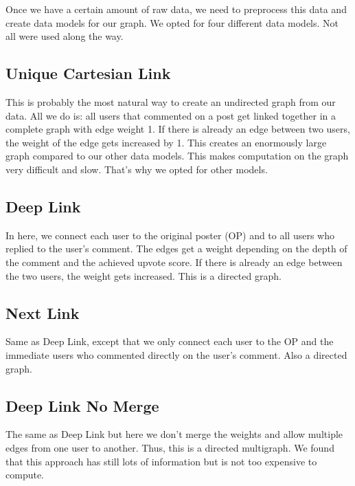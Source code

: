 Once we have a certain amount of raw data, we need to preprocess this data and create data models for our graph. We opted for four different data models. Not all were used along the way.

\subsection{Unique Cartesian Link}
This is probably the most natural way to create an undirected graph from our data. All we do is: all users that commented on a post get linked together in a complete graph with edge weight 1. If there is already an edge between two users, the weight of the edge gets increased by 1. This creates an enormously large graph compared to our other data models. This makes computation on the graph very difficult and slow. That's why we opted for other models.

\subsection{Deep Link}
In here, we connect each user to the original poster (OP) and to all users who replied to the user's comment. The edges get a weight depending on the depth of the comment and the achieved upvote score. If there is already an edge between the two users, the weight gets increased. This is a directed graph.





\subsection{Next Link}
Same as Deep Link, except that we only connect each user to the OP and the immediate users who commented directly on the user's comment. Also a directed graph.

\subsection{Deep Link No Merge}
The same as Deep Link but here we don't merge the weights and allow multiple edges from one user to another. Thus, this is a directed multigraph. We found that this approach has still lots of information but is not too expensive to compute.











